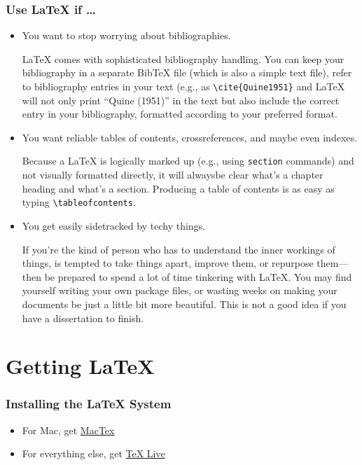 \begin{frame}[fragile]
\frametitle{Use \LaTeX{} if \dots}

\begin{itemize}
\item You want to stop worrying about bibliographies.

\begin{articleonly}
\LaTeX{} comes with sophisticated bibliography handling. You can keep
your bibliography in a separate Bib\TeX{} file (which is also a simple
text file), refer to bibliography entries in your text (e.g., as
\verb+\cite{Quine1951}+ and \LaTeX{} will not only print ``Quine
(1951)'' in the text but also include the correct entry in your
bibliography, formatted according to your preferred format.
\end{articleonly}

\item You want reliable tables of contents, crossreferences, and maybe
  even indexes.

\begin{articleonly}
Because a \LaTeX{} is logically marked up (e.g., using \verb+section+
  commands) and not visually formatted directly, it will alwaysbe
  clear what's a chapter heading and what's a section. Producing a
  table of contents is as easy as typing \verb+\tableofcontents+.
\end{articleonly}

\item You get easily sidetracked by techy things.

\begin{articleonly}
If you're the kind of person who has to understand the inner workings
of things, is tempted to take things apart, improve them, or repurpose
them---then be prepared to spend a lot of time tinkering with
\LaTeX. You may find yourself writing your own package files, or
wasting weeks on making your documents be just a little bit more
beautiful. This is not a good idea if you have a dissertation to
finish.
\end{articleonly}
\end{itemize}

\end{frame}

\section{Getting \LaTeX}

\begin{frame}
\frametitle{Installing the \LaTeX{} System}

\begin{itemize}
\item For Mac, get \href{http://www.tug.org/mactex/}{MacTex}
\item For everything else, get \href{http://www.tug.org/texlive/}{TeX Live}
\end{itemize}

\end{frame}

